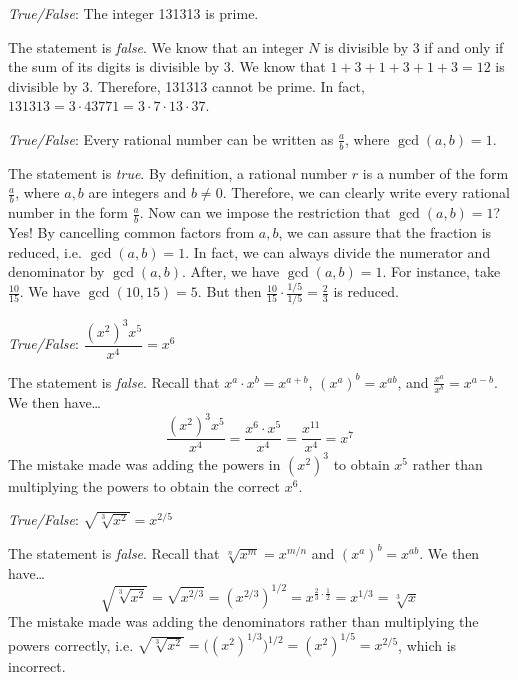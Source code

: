 \documentclass[11pt,letterpaper]{article}
\begin{document}
\thispagestyle{title}

\quizsol \textit{True/False}: The integer 131313 is prime. \pspace

\sol The statement is \textit{false}. We know that an integer $N$ is divisible by 3 if and only if the sum of its digits is divisible by 3. We know that $1 + 3 + 1 + 3 + 1 + 3= 12$ is divisible by 3. Therefore, 131313 cannot be prime. In fact, $131313= 3 \cdot 43771= 3 \cdot 7 \cdot 13 \cdot 37$. \pvspace{1.3cm}



\quizsol \textit{True/False}: Every rational number can be written as $\frac{a}{b}$, where $\gcd(a, b)= 1$. \pspace

\sol The statement is \textit{true}. By definition, a rational number $r$ is a number of the form $\frac{a}{b}$, where $a, b$ are integers and $b \neq 0$. Therefore, we can clearly write every rational number in the form $\frac{a}{b}$. Now can we impose the restriction that $\gcd(a, b)= 1$? Yes! By cancelling common factors from $a, b$, we can assure that the fraction is reduced, i.e. $\gcd(a, b)= 1$. In fact, we can always divide the numerator and denominator by $\gcd(a, b)$. After, we have $\gcd(a, b)= 1$. For instance, take $\frac{10}{15}$. We have $\gcd(10, 15)= 5$. But then $\frac{10}{15} \cdot \frac{1/5}{1/5}= \frac{2}{3}$ is reduced. \pvspace{1.3cm}



\quizsol \textit{True/False}: $\dfrac{(x^2)^3 x^5}{x^4}= x^6$ \pspace

\sol The statement is \textit{false}. Recall that $x^a \cdot x^b= x^{a + b}$, $(x^a)^b= x^{ab}$, and $\frac{x^a}{x^b}= x^{a - b}$. We then have\dots
	\[
	\dfrac{(x^2)^3 x^5}{x^4}= \dfrac{x^6 \cdot x^5}{x^4}= \dfrac{x^{11}}{x^4}= x^7
	\]
The mistake made was adding the powers in $(x^2)^3$ to obtain $x^5$ rather than multiplying the powers to obtain the correct $x^6$. \pvspace{1.3cm}



\quizsol \textit{True/False}: $\sqrt{\sqrt[3]{x^2}}= x^{2/5}$ \pspace

\sol The statement is \textit{false}. Recall that $\sqrt[n]{x^m}= x^{m/n}$ and $(x^a)^b= x^{ab}$. We then have\dots
	\[
	\sqrt{\sqrt[3]{x^2}}= \sqrt{x^{2/3}}= (x^{2/3})^{1/2}= x^{\frac{2}{3} \cdot \frac{1}{2}}= x^{1/3}= \sqrt[3]{x}
	\]
The mistake made was adding the denominators rather than multiplying the powers correctly, i.e. $\sqrt{\sqrt[3]{x^2}}= \big( (x^2)^{1/3} \big)^{1/2}= (x^2)^{1/5}= x^{2/5}$, which is incorrect. \pvspace{1.3cm}
\end{document}
